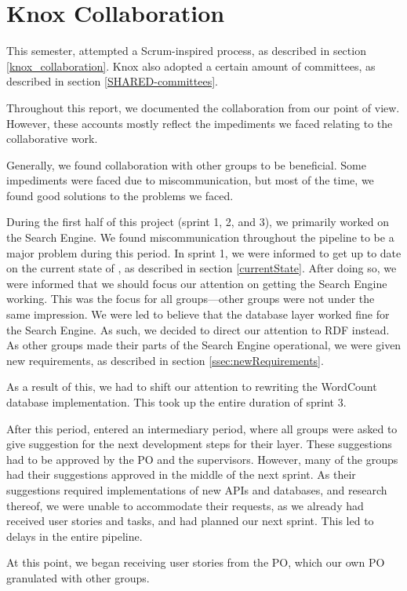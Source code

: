 \section{Knox Collaboration}
This semester, \knox{} attempted a Scrum-inspired process, as described in section \ref{knox_collaboration}. Knox also adopted a certain amount of committees, as described in section \ref{SHARED-committees}.

Throughout this report, we documented the \knox{} collaboration from our point of view. However, these accounts mostly reflect the impediments we faced relating to the collaborative work.

Generally, we found collaboration with other groups to be beneficial. Some impediments were faced due to miscommunication, but most of the time, we found good solutions to the problems we faced.

During the first half of this project (sprint 1, 2, and 3), we primarily worked on the Search Engine. We found miscommunication throughout the pipeline to be a major problem during this period. In sprint 1, we were informed to get up to date on the current state of \knox{}, as described in section \ref{currentState}. After doing so, we were informed that we should focus our attention on getting the Search Engine working. This was the focus for all groups---other groups were not under the same impression. We were led to believe that the database layer worked fine for the Search Engine. As such, we decided to direct our attention to RDF instead. As other groups made their parts of the Search Engine operational, we were given new requirements, as described in section \ref{ssec:newRequirements}.

As a result of this, we had to shift our attention to rewriting the WordCount database implementation. This took up the entire duration of sprint 3.

After this period, \knox{} entered an intermediary period, where all groups were asked to give suggestion for the next development steps for their layer. These suggestions had to be approved by the \knox{} PO and the \knox{} supervisors. However, many of the groups had their suggestions approved in the middle of the next sprint. As their suggestions required implementations of new APIs and databases, and research thereof, we were unable to accommodate their requests, as we already had received user stories and tasks, and had planned our next sprint. This led to delays in the entire pipeline.

At this point, we began receiving user stories from the \knox{} PO, which our own PO granulated with other \knox{} groups.

